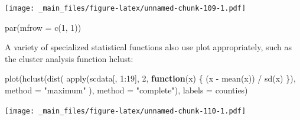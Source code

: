 \documentclass[
]{book}
\newenvironment{Shaded}{\begin{snugshade}}{\end{snugshade}}
\newcommand{\AttributeTok}[1]{\textcolor[rgb]{0.77,0.63,0.00}{#1}}
\newcommand{\ControlFlowTok}[1]{\textcolor[rgb]{0.13,0.29,0.53}{\textbf{#1}}}
\newcommand{\DecValTok}[1]{\textcolor[rgb]{0.00,0.00,0.81}{#1}}
\newcommand{\FunctionTok}[1]{\textcolor[rgb]{0.00,0.00,0.00}{#1}}
\newcommand{\NormalTok}[1]{#1}
\newcommand{\SpecialCharTok}[1]{\textcolor[rgb]{0.00,0.00,0.00}{#1}}
\newcommand{\StringTok}[1]{\textcolor[rgb]{0.31,0.60,0.02}{#1}}
\begin{document}
\begin{Shaded}
\end{Shaded}

\texttt{[image: \_main\_files/figure-latex/unnamed-chunk-109-1.pdf]}

\begin{Shaded}
\begin{Highlighting}[]
\FunctionTok{par}\NormalTok{(}\AttributeTok{mfrow =} \FunctionTok{c}\NormalTok{(}\DecValTok{1}\NormalTok{, }\DecValTok{1}\NormalTok{))}
\end{Highlighting}
\end{Shaded}

A variety of specialized statistical functions also use plot appropriately, such as the cluster analysis function hclust:

\begin{Shaded}
\begin{Highlighting}[]
\FunctionTok{plot}\NormalTok{(}\FunctionTok{hclust}\NormalTok{(}\FunctionTok{dist}\NormalTok{(}
  \FunctionTok{apply}\NormalTok{(scdata[, }\DecValTok{1}\SpecialCharTok{:}\DecValTok{19}\NormalTok{], }\DecValTok{2}\NormalTok{, }\ControlFlowTok{function}\NormalTok{(x) \{}
\NormalTok{    (x }\SpecialCharTok{{-}} \FunctionTok{mean}\NormalTok{(x)) }\SpecialCharTok{/} \FunctionTok{sd}\NormalTok{(x)}
\NormalTok{  \}),}
  \AttributeTok{method =} \StringTok{"maximum"}
\NormalTok{), }\AttributeTok{method =} \StringTok{"complete"}\NormalTok{), }\AttributeTok{labels =}\NormalTok{ counties)}
\end{Highlighting}
\end{Shaded}

\texttt{[image: \_main\_files/figure-latex/unnamed-chunk-110-1.pdf]}
\end{document}
